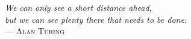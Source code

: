 \begin{flushright}{\slshape    
    \textit{We can only see a short distance ahead, \\
    but we can see plenty there that needs to be done.}} \\ \medskip
    --- \textsc{Alan Turing} \cite{TURING1950}
\end{flushright}

\bigskip




